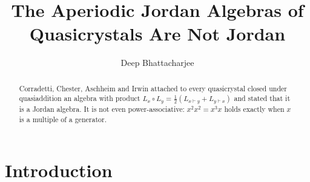 \documentclass[11pt]{amsart}
\theoremstyle{definition}
\theoremstyle{remark}
\begin{document}
\title{The Aperiodic Jordan Algebras of Quasicrystals Are Not Jordan}

\author{Deep Bhattacharjee}
\address{Formerly, Electro-Gravitational Space Propulsion Laboratory (EGSPL), Bhubaneswar, Odisha 751030, India}
\address{Formerly, University of Calcutta (Heramba Chandra College), 23/49 Gariahat Road, Golpark, Kolkata 700029, West Bengal, India}


\begin{abstract}
Corradetti, Chester, Aschheim and Irwin attached to every quasicrystal closed under quasiaddition an algebra with product $L_x\circ L_y=\frac12(L_{x\vdash y}+L_{y\vdash x})$ and stated that it is a Jordan algebra. It is not even power-associative: $x^2x^2=x^3x$ holds exactly when $x$ is a multiple of a generator.
\end{abstract}

\maketitle

\section{Introduction}
\end{document}
